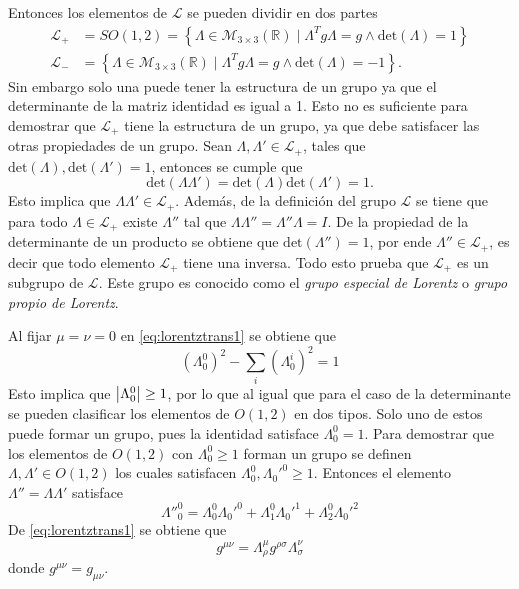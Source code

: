 Entonces los elementos de $\mathcal{L}$ se pueden dividir en dos partes
\begin{align}
	\mathcal{L}_+ & = SO(1,2) = \left\{\Lambda \in \mathcal{M}_{3 \times 3}(\mathbb{R}) \mid \Lambda^{T}g\Lambda = g \wedge \text{det}(\Lambda) =1\right\} \\
	\mathcal{L}_- & = \left\{\Lambda \in \mathcal{M}_{3 \times 3}(\mathbb{R}) \mid \Lambda^{T}g\Lambda = g \wedge \text{det}(\Lambda) =-1\right\}.
\end{align}
Sin embargo solo una puede tener la estructura de un grupo ya que el determinante de la matriz identidad es igual a 1. Esto no es suficiente para demostrar que $\mathcal{L}_+$ tiene la estructura de un grupo, ya que debe satisfacer las otras propiedades de un grupo. Sean $\Lambda, \Lambda' \in \mathcal{L}_+$, tales que $\text{det}(\Lambda),\text{det}(\Lambda')= 1$, entonces se cumple que
\begin{equation}
	\text{det}(\Lambda\Lambda') = \text{det}(\Lambda)\text{det}(\Lambda') =1.
\end{equation}
Esto implica que $\Lambda\Lambda' \in \mathcal{L}_+$. Además, de la definición del grupo $\mathcal{L}$ se tiene que para todo $\Lambda \in \mathcal{L}_+$ existe $\Lambda''$ tal que $\Lambda\Lambda'' = \Lambda''\Lambda=I$. De la propiedad de la determinante de un producto se obtiene que $\text{det}(\Lambda'') = 1$, por ende $\Lambda'' \in \mathcal{L}_+$, es decir que todo elemento $\mathcal{L}_+$ tiene una inversa. Todo esto prueba que $\mathcal{L}_+$ es un subgrupo de $\mathcal{L}$. Este grupo es conocido como el \emph{grupo especial de Lorentz} o \emph{grupo propio de Lorentz}.

Al fijar $\mu= \nu = 0$ en \eqref{eq:lorentztrans1} se obtiene que
\begin{equation}
	(\Lambda_0^0)^2 - \sum_i(\Lambda_0^i)^2 = 1\label{eq:relaorth1}
\end{equation}
Esto implica que $\abs{\Lambda_0^0}\geq 1$, por lo que al igual que para el caso de la determinante se pueden clasificar los elementos de $O(1,2)$ en dos tipos. Solo uno de estos puede formar un grupo, pues la identidad satisface $\Lambda_0^0 =1$. Para demostrar que los elementos de $O(1,2)$ con $\Lambda_0^0\geq 1$ forman un grupo se definen $\Lambda, \Lambda' \in O(1,2)$ los cuales satisfacen $\Lambda_0^0,\Lambda_0'^0\geq 1$. Entonces el elemento $\Lambda'' = \Lambda \Lambda'$ satisface
\begin{equation}
	\Lambda''^0_0 = \Lambda_0^0 \Lambda_0'^0 + \Lambda_1^0 \Lambda_0'^1 + \Lambda_2^0 \Lambda_0'^2\label{eq:orthoProduct}
\end{equation}
De \eqref{eq:lorentztrans1} se obtiene que
\begin{equation}
	g^{\mu\nu} = \Lambda_\rho^{\mu} g^{\rho\sigma}\Lambda_\sigma^{\nu}
\end{equation}
donde $g^{\mu\nu} = g_{\mu\nu}$.


